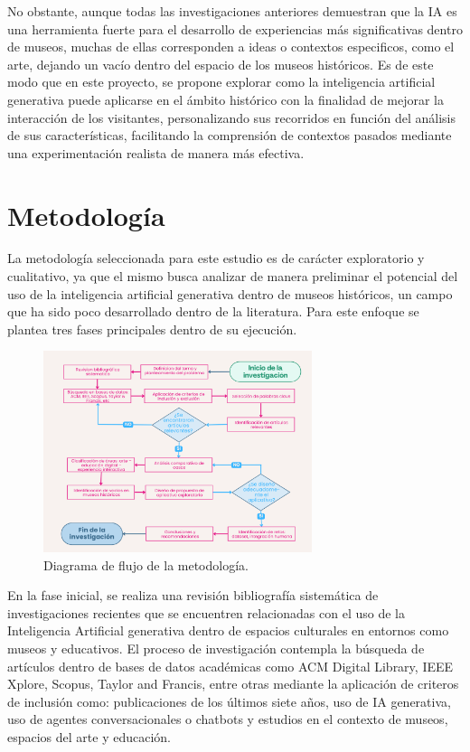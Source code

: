 \documentclass[pdflatex,sn-mathphys-num]{sn-jnl}%
\theoremstyle{thmstyleone}%
\theoremstyle{thmstyletwo}%
\theoremstyle{thmstylethree}%
\begin{document}
No obstante, aunque todas las investigaciones anteriores demuestran que la IA es una herramienta fuerte para el desarrollo de experiencias más significativas dentro de museos, muchas de ellas corresponden a ideas o contextos especificos, como el arte, dejando un vacío dentro del espacio de los museos históricos. Es de este modo que en este proyecto, se propone explorar como la inteligencia artificial generativa puede aplicarse en el ámbito histórico con la finalidad de mejorar la interacción de los visitantes, personalizando sus recorridos en función del análisis de sus características, facilitando la comprensión de contextos pasados mediante una experimentación realista de manera más efectiva.

\section{Metodología}\label{sec11}

La metodología seleccionada para este estudio es de carácter exploratorio y cualitativo, ya que el mismo busca analizar de manera preliminar el potencial del uso de la inteligencia artificial generativa dentro de museos históricos, un campo que ha sido poco desarrollado dentro de la literatura. Para este enfoque se plantea tres fases principales dentro de su ejecución.

\begin{figure}[h] %
    \centering
    \includegraphics[width=0.7\textwidth]{images/Grafica Diagrama de Flujo Profesional Beige.png}
    \caption{\centering Diagrama de flujo de la metodología.}
    \label{fig:metodologia}
\end{figure}

En la fase inicial, se realiza una revisión bibliografía sistemática de investigaciones recientes que se encuentren relacionadas con el uso de la Inteligencia Artificial generativa dentro de espacios culturales en entornos como museos y educativos. El proceso de investigación contempla la búsqueda de artículos dentro de bases de datos académicas como ACM Digital Library, IEEE Xplore, Scopus, Taylor and Francis, entre otras mediante la aplicación de criteros de inclusión como: publicaciones de los últimos siete años, uso de IA generativa, uso de agentes conversacionales o chatbots y estudios en el contexto de museos, espacios del arte y educación.
\end{document}
